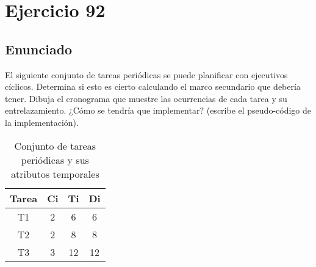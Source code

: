 \documentclass[a4paper,12pt]{article}
\begin{document}


\section{Ejercicio 92}
\subsection{Enunciado}
El siguiente conjunto de tareas periódicas se puede planificar con ejecutivos cíclicos. Determina si esto es cierto calculando el marco secundario que debería tener. Dibuja el cronograma que muestre las ocurrencias de cada tarea y su entrelazamiento. ¿Cómo se tendría que implementar? (escribe el pseudo-código de la implementación).

\begin{table}[H]
\centering
\begin{tabular}{|c|c|c|c|}
\hline
\textbf{Tarea} & \textbf{Ci} & \textbf{Ti} & \textbf{Di} \\ \hline
T1 & 2 & 6 & 6 \\ \hline
T2 & 2 & 8 & 8 \\ \hline
T3 & 3 & 12 & 12 \\ \hline
\end{tabular}
\caption{Conjunto de tareas periódicas y sus atributos temporales}
\end{table}
\end{document}
